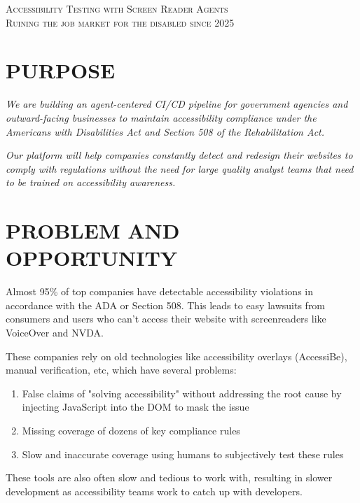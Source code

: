 \begin{center}
    \textsc{\huge Accessibility Testing with Screen Reader Agents}\\[0.1cm]
    \textsc{Ruining the job market for the disabled since 2025}\\[1em]
\end{center}

\section{PURPOSE}
\textit{We are building an agent-centered CI/CD pipeline for government agencies and outward-facing businesses to maintain accessibility compliance under the Americans with Disabilities Act and Section 508 of the Rehabilitation Act.}

\textit{Our platform will help companies constantly detect and redesign their websites to comply with regulations without the need for large quality analyst teams that need to be trained on accessibility awareness.}

\vspace{0.5em}
\section{PROBLEM AND OPPORTUNITY}
Almost 95\% of top companies have detectable accessibility violations in accordance with the ADA or Section 508. This leads to easy lawsuits from consumers and users who can't access their website with screenreaders like VoiceOver and NVDA.

These companies rely on old technologies like accessibility overlays (AccessiBe), manual verification, etc, which have several problems:

\begin{enumerate}
    \item False claims of "solving accessibility" without addressing the root cause by injecting JavaScript into the DOM to mask the issue
    \item Missing coverage of dozens of key compliance rules
    \item Slow and inaccurate coverage using humans to subjectively test these rules
\end{enumerate}

These tools are also often slow and tedious to work with, resulting in slower development as accessibility teams work to catch up with developers.

\vspace{0.5em}
